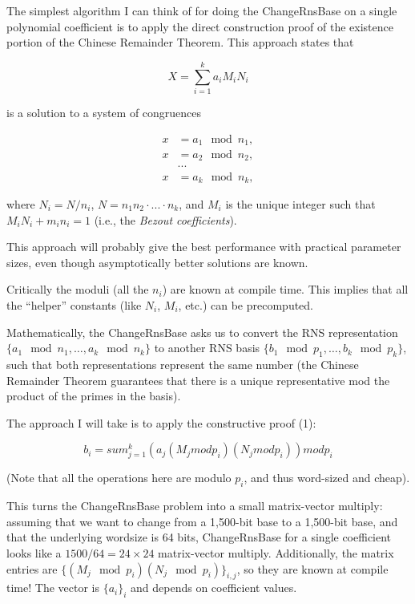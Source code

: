 The simplest algorithm I can think of for doing the ChangeRnsBase on a single
polynomial coefficient is to apply the direct construction proof of the
existence portion of the Chinese Remainder Theorem\cite{gauss1966english}.
This approach states that

\begin{equation*}
X = \sum_{i=1}^k a_i M_i N_i
\end{equation*}

is a solution to a system of congruences

\begin{align*}
    x &= a_1 \mod n_1, \\
    x &= a_2 \mod n_2, \\
      &... \\
    x &= a_k \mod n_k,
\end{align*}

where $N_i = N/n_i$, $N=n_1n_2\cdot...\cdot n_k$, and $M_i$ is the unique integer
such that $M_iN_i + m_in_i = 1$ (i.e., the \emph{Bezout coefficients}).

This approach will probably give the best performance with practical parameter
sizes, even though asymptotically better solutions are known.

Critically the moduli (all the $n_i$) are known at compile time. This implies
that all the “helper” constants (like $N_i$, $M_i$, etc.) can be precomputed.

Mathematically, the ChangeRnsBase asks us to convert the RNS representation
$\{a_1 \mod n_1, …, a_k \mod n_k\}$ to another RNS basis $\{b_1 \mod p_1, …, b_k
\mod p_k\}$, such that both representations represent the same number (the
Chinese Remainder Theorem guarantees that there is a unique representative mod
the product of the primes in the basis).

The approach I will take is to apply the constructive proof (1):

\begin{equation*}
b_i = sum_{j=1}^k (a_j (M_j mod p_i) (N_j mod p_i)) mod p_i
\end{equation*}

(Note that all the operations here are modulo $p_i$, and thus word-sized and
cheap).

This turns the ChangeRnsBase problem into a small matrix-vector multiply:
assuming that we want to change from a 1,500-bit base to a 1,500-bit base, and
that the underlying wordsize is 64 bits, ChangeRnsBase for a single coefficient
looks like a $1500/64=24\times 24$ matrix-vector multiply.
Additionally, the matrix entries are $\{(M_j \mod p_i) (N_j \mod p_i)\}_{i,
j}$, so they are known at compile time!
The vector is $\{a_i\}_i$ and depends on coefficient values.

